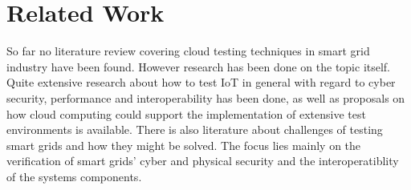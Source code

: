 \section{Related Work}
So far no literature review covering cloud testing techniques in smart grid industry have been found. However research has been done on the topic itself. Quite extensive research about how to test IoT in general with regard to cyber security, performance and interoperability has been done, as well as proposals on how cloud computing could support the implementation of extensive test environments is available. There is also literature about challenges of testing smart grids and how they might be solved. The focus lies mainly on the verification of smart grids' cyber and physical security and the interoperatiblity of the systems components.

